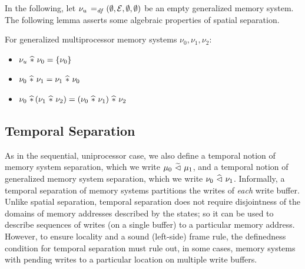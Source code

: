 \documentclass[11pt]{report}
\begin{document}
In the following, let $\nu_u \operatorname{\;=_{\mathit{df}}\;} (\operatorname{\emptyset}, \mathcal{E}, \operatorname{\emptyset}, \operatorname{\emptyset})$ be an empty generalized memory system. The following lemma asserts some algebraic properties of spatial separation. \begin{lemma}
  \label{lem:spatial-separation-algebra}
  For generalized multiprocessor memory systems $\nu_0, \nu_1, \nu_2$: 
  \begin{itemize}
    \item $\nu_u \operatorname{\,\widehat{\ast}\,} \nu_0 = \left\lbrace \nu_0 \right\rbrace$
    \item $\nu_0 \operatorname{\,\widehat{\ast}\,} \nu_1 = \nu_1 \operatorname{\,\widehat{\ast}\,} \nu_0$
    \item $\nu_0 \operatorname{\,\widehat{\ast}\,} (\nu_1 \operatorname{\,\widehat{\ast}\,} \nu_2) = (\nu_0 \operatorname{\,\widehat{\ast}\,} \nu_1) \operatorname{\,\widehat{\ast}\,} \nu_2$
  \end{itemize}
\end{lemma}

\subsection{Temporal Separation}
\label{sec:temporal-separation}

As in the sequential, uniprocessor case, we also define a temporal notion of memory system separation, which we write $\mu_0 \operatorname{\,\widetilde{\vartriangleleft}\,} \mu_1$, and a temporal notion of generalized memory system separation, which we write $\nu_0 \operatorname{\,\widehat{\vartriangleleft}\,} \nu_1$. Informally, a temporal separation of memory systems partitions the writes of \emph{each} write buffer. Unlike spatial separation, temporal separation does not require disjointness of the domains of memory addresses described by the states; so it can be used to describe sequences of writes (on a single buffer) to a particular memory address. However, to ensure locality and a sound (left-side) frame rule, the definedness condition for temporal separation must rule out, in some cases, memory systems with pending writes to a particular location on multiple write buffers. 
\end{document}
